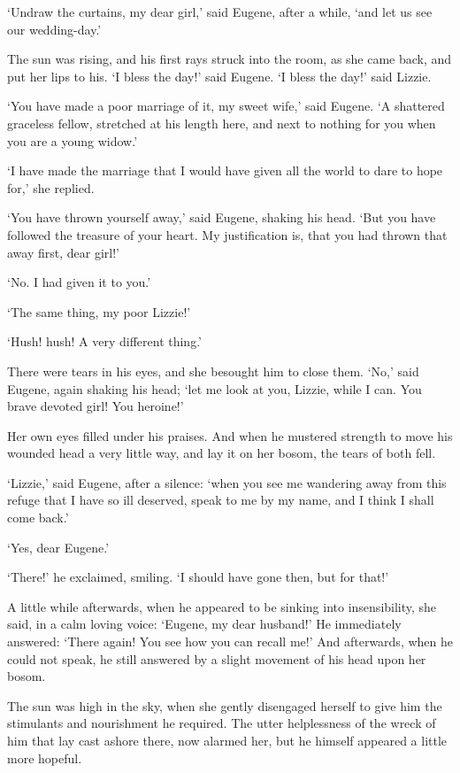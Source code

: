 ‘Undraw the curtains, my dear girl,’ said Eugene, after a while, ‘and
let us see our wedding-day.’

The sun was rising, and his first rays struck into the room, as she came
back, and put her lips to his. ‘I bless the day!’ said Eugene. ‘I bless
the day!’ said Lizzie.

‘You have made a poor marriage of it, my sweet wife,’ said Eugene. ‘A
shattered graceless fellow, stretched at his length here, and next to
nothing for you when you are a young widow.’

‘I have made the marriage that I would have given all the world to dare
to hope for,’ she replied.

‘You have thrown yourself away,’ said Eugene, shaking his head. ‘But you
have followed the treasure of your heart. My justification is, that you
had thrown that away first, dear girl!’

‘No. I had given it to you.’

‘The same thing, my poor Lizzie!’

‘Hush! hush! A very different thing.’

There were tears in his eyes, and she besought him to close them. ‘No,’
said Eugene, again shaking his head; ‘let me look at you, Lizzie, while
I can. You brave devoted girl! You heroine!’

Her own eyes filled under his praises. And when he mustered strength to
move his wounded head a very little way, and lay it on her bosom, the
tears of both fell.

‘Lizzie,’ said Eugene, after a silence: ‘when you see me wandering away
from this refuge that I have so ill deserved, speak to me by my name,
and I think I shall come back.’

‘Yes, dear Eugene.’

‘There!’ he exclaimed, smiling. ‘I should have gone then, but for that!’

A little while afterwards, when he appeared to be sinking into
insensibility, she said, in a calm loving voice: ‘Eugene, my dear
husband!’ He immediately answered: ‘There again! You see how you can
recall me!’ And afterwards, when he could not speak, he still answered
by a slight movement of his head upon her bosom.

The sun was high in the sky, when she gently disengaged herself to give
him the stimulants and nourishment he required. The utter helplessness
of the wreck of him that lay cast ashore there, now alarmed her, but he
himself appeared a little more hopeful.

